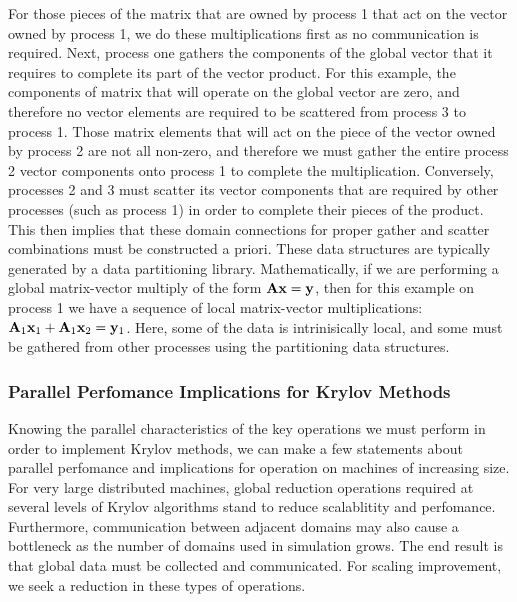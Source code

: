 For those pieces of the matrix that are owned by process 1 that act on
the vector owned by process 1, we do these multiplications first as no
communication is required. Next, process one gathers the components of
the global vector that it requires to complete its part of the vector
product. For this example, the components of matrix that will operate
on the global vector are zero, and therefore no vector elements are
required to be scattered from process 3 to process 1. Those matrix
elements that will act on the piece of the vector owned by process 2
are not all non-zero, and therefore we must gather the entire process
2 vector components onto process 1 to complete the multiplication.
Conversely, processes 2 and 3 must scatter its vector components that
are required by other processes (such as process 1) in order to
complete their pieces of the product. This then implies that these
domain connections for proper gather and scatter combinations must be
constructed a priori. These data structures are typically generated by
a data partitioning library. Mathematically, if we are performing a
global matrix-vector multiply of the form $\mathbf{A}\mathbf{x} = \mathbf{y}$,
then for this example on process 1 we have a sequence of local
matrix-vector multiplications: $\mathbf{A}_1\mathbf{x}_1 + \mathbf{A}_1\mathbf{x}_2 =
\mathbf{y}_1$. Here, some of the data is intrinisically local, and some
must be gathered from other processes using the partitioning data
structures.

\subsubsection{Parallel Perfomance Implications for Krylov Methods}
\label{subsubsec:projection_method_performance}
Knowing the parallel characteristics of the key operations we must
perform in order to implement Krylov methods, we can make a few
statements about parallel perfomance and implications for operation on
machines of increasing size.  For very large distributed machines,
global reduction operations required at several levels of Krylov
algorithms stand to reduce scalablitity and perfomance. Furthermore,
communication between adjacent domains may also cause a bottleneck as
the number of domains used in simulation grows. The end result is that
global data must be collected and communicated. For scaling
improvement, we seek a reduction in these types of operations.

